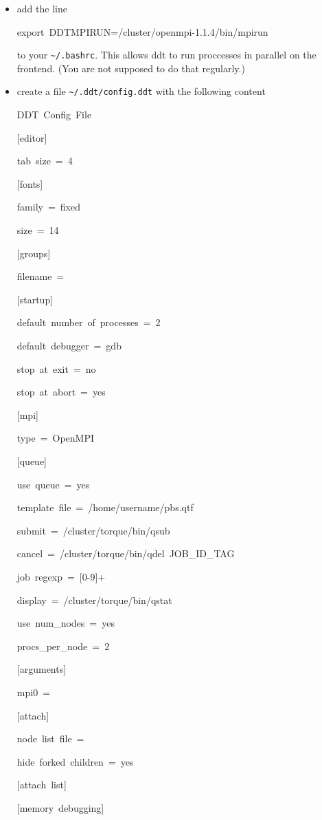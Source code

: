 \begin{itemize}
\item add the line

\begin{lyxcode}
export~DDTMPIRUN=/cluster/openmpi-1.1.4/bin/mpirun
\end{lyxcode}
to your \texttt{\textasciitilde{}/.bashrc}. This allows ddt to run
proccesses in parallel on the frontend. (You are not supposed to do
that regularly.)

\item create a file \texttt{\textasciitilde{}/.ddt/config.ddt} with the
following content

\begin{lyxcode}
DDT~Config~File

{[}editor]~

tab~size~=~4

{[}fonts]~

family~=~fixed~

size~=~14

{[}groups]~

filename~=

{[}startup]~

default~number~of~processes~=~2~

default~debugger~=~gdb~

stop~at~exit~=~no~

stop~at~abort~=~yes

{[}mpi]~

type~=~OpenMPI

{[}queue]~

use~queue~=~yes~

template~file~=~/home/username/pbs.qtf~

submit~=~/cluster/torque/bin/qsub~

cancel~=~/cluster/torque/bin/qdel~JOB\_ID\_TAG~

job~regexp~=~{[}0-9]+~

display~=~/cluster/torque/bin/qstat~

use~num\_nodes~=~yes~

procs\_per\_node~=~2

{[}arguments]~

mpi0~=

{[}attach]~

node~list~file~=~

hide~forked~children~=~yes

{[}attach~list]

{[}memory~debugging]~


\end{lyxcode}
\end{itemize}
